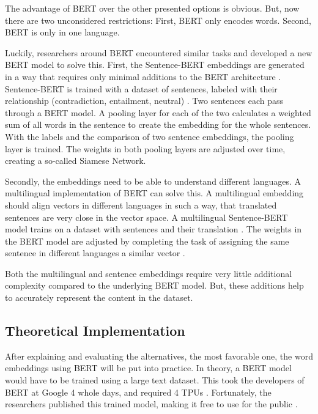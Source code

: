 			The advantage of BERT over the other presented options is obvious. But, now there are two unconsidered restrictions:
			First, BERT only encodes words.
			Second, BERT is only in one language.
			
			Luckily, researchers around BERT encountered similar tasks and developed a new BERT model to solve this. 
			First, the Sentence-BERT embeddings are generated in a way that requires only minimal additions to the BERT architecture \cite{sentenceBERT}. Sentence-BERT is trained with a dataset of sentences, labeled with their relationship (contradiction, entailment, neutral) \cite{sentenceBERT}. Two sentences each pass through a BERT model. A pooling layer for each of the two calculates a weighted sum of all words in the sentence to create the embedding for the whole sentences. With the labels and the comparison of two sentence embeddings, the pooling layer is trained. The weights in both pooling layers are adjusted over time, creating a so-called Siamese Network.
			
			Secondly, the embeddings need to be able to understand different languages. A multilingual implementation of BERT can solve this. A multilingual embedding should align vectors in different languages in such a way, that translated sentences are very close in the vector space. A multilingual Sentence-BERT model trains on a dataset with sentences and their translation \cite{mBERT}. The weights in the BERT model are adjusted by completing the task of assigning the same sentence in different languages a similar vector \cite{mBERT}.
			
			Both the multilingual and sentence embeddings require very little additional complexity compared to the underlying BERT model. But, these additions help to accurately represent the content in the dataset.
			
            \subsection{Theoretical Implementation}
            
           	After explaining and evaluating the alternatives, the most favorable one, the word embeddings using \ac{BERT} will be put into practice. In theory, a BERT model would have to be trained using a large text dataset. This took the developers of BERT at Google 4 whole days, and required 4 \ac{TPU}s \cite{BERTTraining}. Fortunately, the researchers published this trained model, making it free to use for the public \cite{BERT}.
            	
